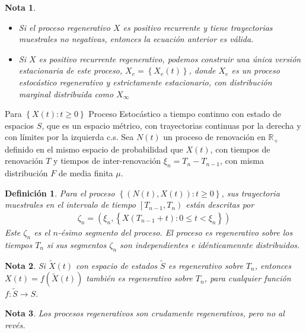 \documentclass{article}
\newtheorem{Def}{Definición}
\newtheorem{Note}{Nota}
\newcommand{\rea}{\mathbb{R}}
\begin{document}
\begin{Note}
\begin{itemize}
\item[a)] Si el proceso regenerativo $X$ es positivo recurrente y tiene trayectorias muestrales no negativas, entonces la ecuaci\'on anterior es v\'alida.
\item[b)] Si $X$ es positivo recurrente regenerativo, podemos construir una \'unica versi\'on estacionaria de este proceso, $X_{e}=\left\{X_{e}\left(t\right)\right\}$, donde $X_{e}$ es un proceso estoc\'astico regenerativo y estrictamente estacionario, con distribuci\'on marginal distribuida como $X_{\infty}$
\end{itemize}
\end{Note}

Para $\left\{X\left(t\right):t\geq0\right\}$ Proceso Estoc\'astico a tiempo continuo con estado de espacios $S$, que es un espacio m\'etrico, con trayectorias continuas por la derecha y con l\'imites por la izquierda c.s. Sea $N\left(t\right)$ un proceso de renovaci\'on en $\rea_{+}$ definido en el mismo espacio de probabilidad que $X\left(t\right)$, con tiempos de renovaci\'on $T$ y tiempos de inter-renovaci\'on $\xi_{n}=T_{n}-T_{n-1}$, con misma distribuci\'on $F$ de media finita $\mu$.


\begin{Def}
Para el proceso $\left\{\left(N\left(t\right),X\left(t\right)\right):t\geq0\right\}$, sus trayectoria muestrales en el intervalo de tiempo $\left[T_{n-1},T_{n}\right)$ est\'an descritas por
\begin{eqnarray*}
\zeta_{n}=\left(\xi_{n},\left\{X\left(T_{n-1}+t\right):0\leq t<\xi_{n}\right\}\right)
\end{eqnarray*}
Este $\zeta_{n}$ es el $n$-\'esimo segmento del proceso. El proceso es regenerativo sobre los tiempos $T_{n}$ si sus segmentos $\zeta_{n}$ son independientes e id\'enticamennte distribuidos.
\end{Def}


\begin{Note}
Si $\tilde{X}\left(t\right)$ con espacio de estados $\tilde{S}$ es regenerativo sobre $T_{n}$, entonces $X\left(t\right)=f\left(\tilde{X}\left(t\right)\right)$ tambi\'en es regenerativo sobre $T_{n}$, para cualquier funci\'on $f:\tilde{S}\rightarrow S$.
\end{Note}

\begin{Note}
Los procesos regenerativos son crudamente regenerativos, pero no al rev\'es.
\end{Note}
\end{document}
